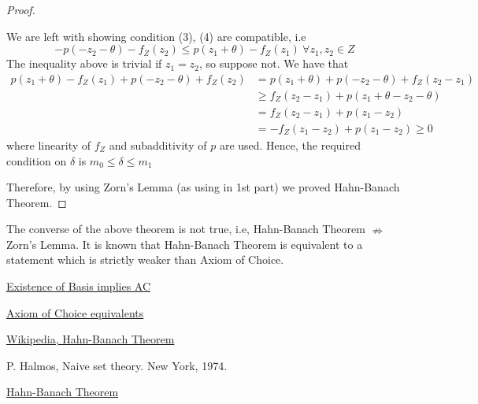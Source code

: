 \documentclass[11pt,a4paper]{article}
\begin{document}
\begin{proof}
\begin{enumerate}
$$            $$
            We are left with showing condition (3), (4) are compatible, i.e
            $$
                -p(-z_2 - \theta) - f_Z(z_2) \leq p(z_1 + \theta) - f_Z(z_1)\ \forall z_1, z_2  \in Z
            $$
            The inequality above is trivial if $z_1 = z_2$, so suppose not. We have that
            \begin{align*}
                p(z_1 + \theta) - f_Z(z_1) + p(-z_2 - \theta) + f_Z(z_2) &= p(z_1 + \theta) + p(-z_2 - \theta) + f_Z(z_2 - z_1)\\
                &\geq f_Z(z_2 - z_1) + p(z_1 + \theta - z_2 - \theta)\\
                &= f_Z(z_2 - z_1) + p(z_1 - z_2)\\
                &=  - f_Z(z_1 - z_2) + p(z_1 - z_2) \geq 0
            \end{align*}
            where linearity of $f_Z$ and subadditivity of $p$ are used. Hence, the required condition on $\delta$ is $m_0 \leq \delta \leq m_1$
        \end{enumerate}
    Therefore, by using Zorn's Lemma (as using in 1st part) we proved Hahn-Banach Theorem.
\end{proof}

\begin{note}
    The converse of the above theorem is not true, i.e, Hahn-Banach Theorem $\nRightarrow$ Zorn's Lemma. It is known that Hahn-Banach Theorem is equivalent to a statement which is strictly weaker than Axiom of Choice.\cite{WikiHBT}
\end{note}

\newpage

\begin{thebibliography}{9}

\href{http://www.math.lsa.umich.edu/~ablass/bases-AC.pdf}{Existence of Basis implies AC}

\href{http://www.borisbukh.org/MathStudiesAlgebra1718/notes_ac.pdf}{Axiom of Choice equivalents}

\href{https://en.wikipedia.org/wiki/Hahn-Banach_theorem#Relation_to_axiom_of_choice}{Wikipedia, Hahn-Banach Theorem}

P. Halmos, Naive set theory. New York, 1974.

\href{https://www.math.utah.edu/~tan/6710_FA/Hahn Banach Theorem.pdf}{Hahn-Banach Theorem}

\end{thebibliography}
\end{document}
